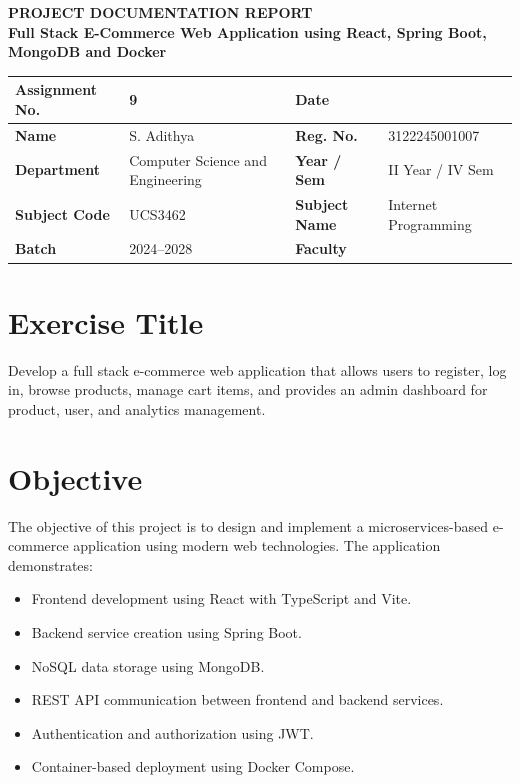 \documentclass[12pt,a4paper]{article}
\begin{document}
\begin{center}
    {\Large\bfseries PROJECT DOCUMENTATION REPORT}\\[0.4cm]
    {\large\bfseries Full Stack E-Commerce Web Application using React, Spring Boot, MongoDB and Docker}
\end{center}

\vspace{0.3cm}

\begin{tabularx}{\textwidth}{|>{\bfseries}l|X|>{\bfseries}l|X|}
\hline
Assignment No. & 9 & Date & \underline{\hspace{3cm}} \\ \hline
Name & S. Adithya & Reg. No. & 3122245001007 \\ \hline
Department & Computer Science and Engineering & Year / Sem & II Year / IV Sem \\ \hline
Subject Code & UCS3462 & Subject Name & Internet Programming \\ \hline
Batch & 2024--2028 & Faculty & \underline{\hspace{3cm}} \\ \hline
\end{tabularx}

\vspace{0.5cm}

\section*{Exercise Title}
Develop a full stack e-commerce web application that allows users to register, log in, browse products, manage cart items, and provides an admin dashboard for product, user, and analytics management.

\section*{Objective}
The objective of this project is to design and implement a microservices-based e-commerce application using modern web technologies. The application demonstrates:
\begin{itemize}[leftmargin=1.5cm]
    \item Frontend development using React with TypeScript and Vite.
    \item Backend service creation using Spring Boot.
    \item NoSQL data storage using MongoDB.
    \item REST API communication between frontend and backend services.
    \item Authentication and authorization using JWT.
    \item Container-based deployment using Docker Compose.
\end{itemize}
\end{document}
